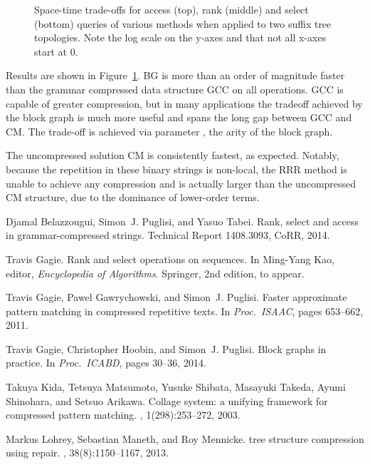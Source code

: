 \documentclass[12pt]{article}
\begin{document}
{\begin{figure}[htb]
\caption{Space-time trade-offs for access (top), rank (middle) and select (bottom) queries
of various methods when applied to two suffix tree topologies.
Note the log scale on the y-axes and that not all x-axes start at 0.
}
\label{figure:bitvectors}
\end{figure}

Results are shown in Figure~\ref{figure:bitvectors}. 
BG is more than an order of magnitude faster than the grammar compressed data structure GCC
on all operations. GCC is capable of greater compression, but in many applications the 
tradeoff achieved by the block graph is much more useful and spans the long gap between
GCC and CM. The trade-off is achieved via parameter , the arity of the block graph. 

The uncompressed solution CM is consistently fastest, 
as expected. Notably, because the repetition in these binary strings is non-local, the 
RRR method is unable to achieve any compression and is actually larger than the 
uncompressed CM structure, due to the dominance of lower-order terms.

\begin{thebibliography}{10}

Djamal Belazzougui, Simon~J. Puglisi, and Yasuo Tabei.
\newblock Rank, select and access in grammar-compressed strings.
\newblock Technical Report 1408.3093, CoRR, 2014.
 
Travis Gagie.
\newblock Rank and select operations on sequences.
\newblock In Ming{-}Yang Kao, editor, {\em Encyclopedia of Algorithms}.
  Springer, 2nd edition, to appear.
 
Travis Gagie, Pawel Gawrychowski, and Simon~J. Puglisi.
\newblock Faster approximate pattern matching in compressed repetitive texts.
\newblock In {\em Proc.\ ISAAC}, pages 653--662, 2011.
 
Travis Gagie, Christopher Hoobin, and Simon~J. Puglisi.
\newblock Block graphs in practice.
\newblock In {\em Proc.\ ICABD}, pages 30--36, 2014.
 
Takuya Kida, Tetsuya Matsumoto, Yusuke Shibata, Masayuki Takeda, Ayumi
  Shinohara, and Setsuo Arikawa.
\newblock Collage system: a unifying framework for compressed pattern matching.
, 1(298):253--272, 2003.
 
Markus Lohrey, Sebastian Maneth, and Roy Mennicke.
 tree structure compression using repair.
, 38(8):1150--1167, 2013.
 

\end{thebibliography}}
\end{document}
